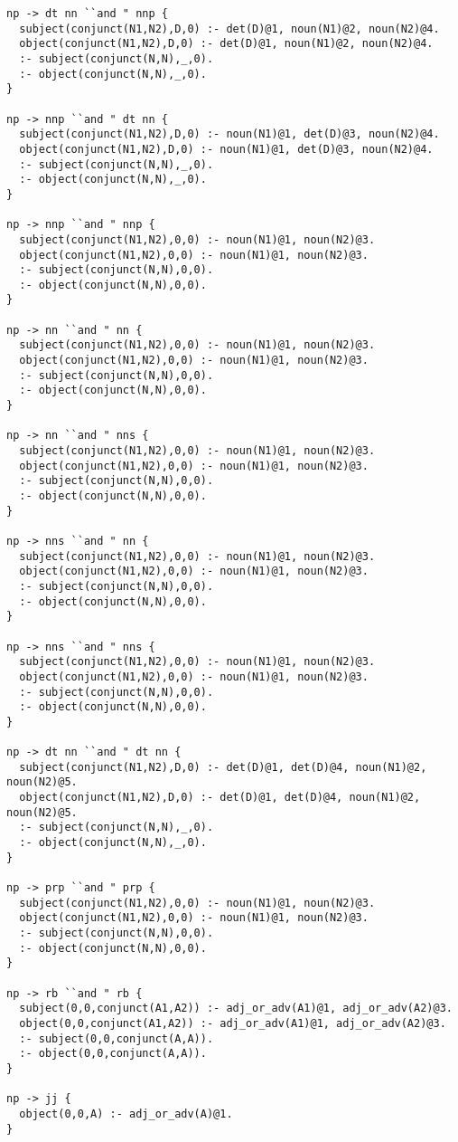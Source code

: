 \begin{lstlisting}
np -> dt nn ``and " nnp {
  subject(conjunct(N1,N2),D,0) :- det(D)@1, noun(N1)@2, noun(N2)@4.
  object(conjunct(N1,N2),D,0) :- det(D)@1, noun(N1)@2, noun(N2)@4.
  :- subject(conjunct(N,N),_,0).
  :- object(conjunct(N,N),_,0).
}

np -> nnp ``and " dt nn {
  subject(conjunct(N1,N2),D,0) :- noun(N1)@1, det(D)@3, noun(N2)@4.
  object(conjunct(N1,N2),D,0) :- noun(N1)@1, det(D)@3, noun(N2)@4.
  :- subject(conjunct(N,N),_,0).
  :- object(conjunct(N,N),_,0).
}

np -> nnp ``and " nnp {
  subject(conjunct(N1,N2),0,0) :- noun(N1)@1, noun(N2)@3.
  object(conjunct(N1,N2),0,0) :- noun(N1)@1, noun(N2)@3.
  :- subject(conjunct(N,N),0,0).
  :- object(conjunct(N,N),0,0).
}

np -> nn ``and " nn {
  subject(conjunct(N1,N2),0,0) :- noun(N1)@1, noun(N2)@3.
  object(conjunct(N1,N2),0,0) :- noun(N1)@1, noun(N2)@3.
  :- subject(conjunct(N,N),0,0).
  :- object(conjunct(N,N),0,0).
}

np -> nn ``and " nns {
  subject(conjunct(N1,N2),0,0) :- noun(N1)@1, noun(N2)@3.
  object(conjunct(N1,N2),0,0) :- noun(N1)@1, noun(N2)@3.
  :- subject(conjunct(N,N),0,0).
  :- object(conjunct(N,N),0,0).
}

np -> nns ``and " nn {
  subject(conjunct(N1,N2),0,0) :- noun(N1)@1, noun(N2)@3.
  object(conjunct(N1,N2),0,0) :- noun(N1)@1, noun(N2)@3.
  :- subject(conjunct(N,N),0,0).
  :- object(conjunct(N,N),0,0).
}

np -> nns ``and " nns {
  subject(conjunct(N1,N2),0,0) :- noun(N1)@1, noun(N2)@3.
  object(conjunct(N1,N2),0,0) :- noun(N1)@1, noun(N2)@3.
  :- subject(conjunct(N,N),0,0).
  :- object(conjunct(N,N),0,0).
}

np -> dt nn ``and " dt nn {
  subject(conjunct(N1,N2),D,0) :- det(D)@1, det(D)@4, noun(N1)@2, noun(N2)@5.
  object(conjunct(N1,N2),D,0) :- det(D)@1, det(D)@4, noun(N1)@2, noun(N2)@5.
  :- subject(conjunct(N,N),_,0).
  :- object(conjunct(N,N),_,0).
}

np -> prp ``and " prp {
  subject(conjunct(N1,N2),0,0) :- noun(N1)@1, noun(N2)@3.
  object(conjunct(N1,N2),0,0) :- noun(N1)@1, noun(N2)@3.
  :- subject(conjunct(N,N),0,0).
  :- object(conjunct(N,N),0,0).
}

np -> rb ``and " rb {
  subject(0,0,conjunct(A1,A2)) :- adj_or_adv(A1)@1, adj_or_adv(A2)@3.
  object(0,0,conjunct(A1,A2)) :- adj_or_adv(A1)@1, adj_or_adv(A2)@3.
  :- subject(0,0,conjunct(A,A)).
  :- object(0,0,conjunct(A,A)).
}

np -> jj {
  object(0,0,A) :- adj_or_adv(A)@1.
}


\end{lstlisting}
